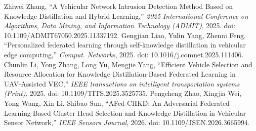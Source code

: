  Zhiwei Zhang, ``A Vehicular Network Intrusion Detection Method Based on Knowledge Distillation and Hybrid Learning,'' \emph{2025 International Conference on Algorithms, Data Mining, and Information Technology (ADMIT)}, 2025. doi: 10.1109/ADMIT67050.2025.11337192.
 Gengjian Liao, Yulin Yang, Zhenni Feng, ``Personalized federated learning through self-knowledge distillation in vehicular edge computing,'' \emph{Comput. Networks}, 2025. doi: 10.1016/j.comnet.2025.111406.
 Chunlin Li, Yong Zhang, Long Yu, Mengjie Yang, ``Efficient Vehicle Selection and Resource Allocation for Knowledge Distillation-Based Federated Learning in UAV-Assisted VEC,'' \emph{IEEE transactions on intelligent transportation systems (Print)}, 2025. doi: 10.1109/TITS.2025.3525735.
 Pengcheng Zhao, Xingjia Wei, Yong Wang, Xin Li, Shibao Sun, ``AFed-CHKD: An Adversarial Federated Learning-Based Cluster Head Selection and Knowledge Distillation in Vehicular Sensor Network,'' \emph{IEEE Sensors Journal}, 2026. doi: 10.1109/JSEN.2026.3665994.


